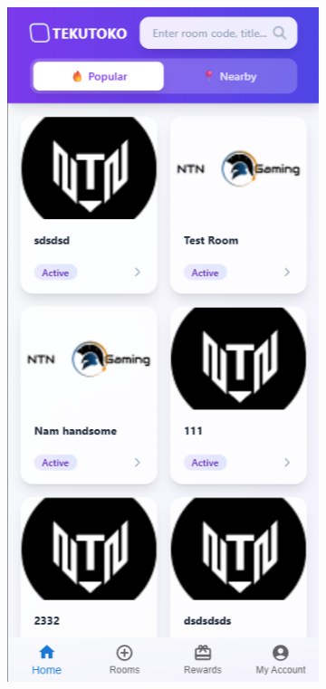 \begin{figure}[h!]
    \centering
    \begin{subfigure}[b]{0.3\textwidth}
        \centering
        \includegraphics[width=\textwidth]{figures/ui-dashboard.png}

\end{subfigure}
\end{figure}
